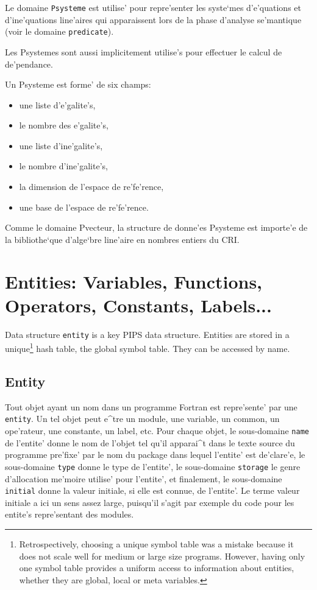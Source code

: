 {}

Le domaine {\tt Psysteme} est utilise' pour repre'senter les syste`mes
d'e'quations et d'ine'quations line'aires qui apparaissent lors
de la phase d'analyse se'mantique (voir le domaine {\tt predicate}).

Les Psystemes sont aussi implicitement utilise's pour effectuer le
calcul de de'pendance.

Un Psysteme est forme' de six champs:
\begin{itemize}
  \item une liste d'e'galite's,
  \item le nombre des e'galite's,
  \item une liste d'ine'galite's,
  \item le nombre d'ine'galite's,
  \item la dimension de l'espace de re'fe'rence,
  \item une base de l'espace de re'fe'rence.
\end{itemize}

Comme le domaine Pvecteur, la structure de donne'es Psysteme est
importe'e de la bibliothe`que d'alge`bre line'aire en nombres entiers du
CRI.

\section{Entities: Variables, Functions, Operators, Constants, Labels...}
\label{entity}

Data structure \verb/entity/ is a key PIPS data structure. Entities are
stored in a unique\footnote{Retrospectively, choosing a unique symbol
table was a mistake because it does not scale well for medium or large
size programs. However, having only one symbol table provides a uniform
access to information about entities, whether they are global, local or
meta variables.} hash table, the global symbol table. They can be
accessed by name.

\subsection{Entity}
\label{subsection-entity}


Tout objet ayant un nom dans un programme Fortran est repre'sente' par
une \verb/entity/. Un tel objet peut e^tre un module, une variable, un
common, un ope'rateur, une constante, un label, etc. Pour chaque objet,
le sous-domaine \verb/name/ de l'entite' donne le nom de l'objet tel
qu'il apparai^t dans le texte source du programme pre'fixe' par le nom du
package dans lequel l'entite' est de'clare'e, le sous-domaine
\verb/type/ donne le type de l'entite', le sous-domaine \verb/storage/
le genre d'allocation me'moire utilise' pour l'entite', et finalement,
le sous-domaine \verb/initial/ donne la valeur initiale, si elle est
connue, de l'entite'. Le terme valeur initiale a ici un sens assez
large, puisqu'il s'agit par exemple du code pour les entite's
repre'sentant des modules.

